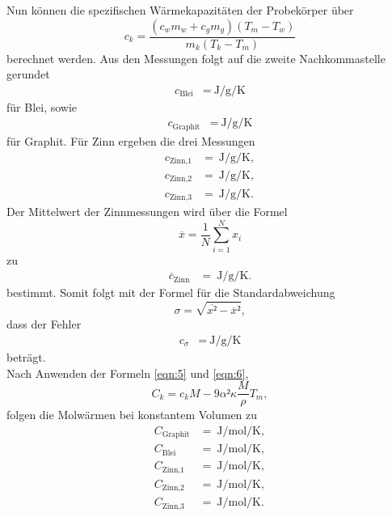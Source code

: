 Nun können die spezifischen Wärmekapazitäten der Probekörper über
\begin{equation}
  c_k = \frac{(c_wm_w+c_gm_g)(T_m-T_w)}{m_k(T_k-T_m)}
\end{equation}
berechnet werden.
Aus den Messungen folgt auf die zweite Nachkommastelle gerundet
\begin{align}
  c_{\text{Blei}} &= \: \si{\joule\per\gram\per\kelvin} \label{Bleiwert:c}
\end{align}
für Blei, sowie
\begin{align}
  c_{\text{Graphit}} &= \: \si{\joule\per\gram\per\kelvin} \label{Bullseye:c}
\end{align}
für Graphit.
Für Zinn ergeben die drei Messungen
\begin{align}
  c_{\text{Zinn,1}} &= \: \si{\joule\per\gram\per\kelvin} \label{Kackwert:c},\\
  c_{\text{Zinn,2}} &= \: \si{\joule\per\gram\per\kelvin},\\
  c_{\text{Zinn,3}} &= \: \si{\joule\per\gram\per\kelvin}.
\end{align}
Der Mittelwert der Zinnmessungen wird über die Formel
\begin{equation}
  \overline{x} = \frac{1}{N} \sum_{i=1}^N x_i \label{eqn:9}
\end{equation}
zu
\begin{align}
  \overline{c}_{\text{Zinn}} &= \: \si{\joule\per\gram\per\kelvin}.
\end{align}
bestimmt.
Somit folgt mit der Formel für die Standardabweichung
\begin{equation}
  \sigma = \sqrt{\overline{x²}-\overline{x}²} \label{eqn:10},
\end{equation}
dass der Fehler
\begin{align}
  c_{\sigma} &= \: \si{\joule\per\gram\per\kelvin}
\end{align}
beträgt.\\
Nach Anwenden der Formeln \ref{eqn:5} und \ref{eqn:6},
\begin{equation}
  C_k = c_k M - 9\alpha² \kappa \frac{M}{\rho} T_m,
\end{equation}
folgen die Molwärmen bei konstantem Volumen zu
\begin{align}
  C_{\text{Graphit}} &= \: \si{\joule\per\mol\per\kelvin} \label{Bullseye:C},\\
  C_{\text{Blei}}    &= \: \si{\joule\per\mol\per\kelvin} \label{Bleiwert:C},\\
  C_{\text{Zinn,1}}  &= \: \si{\joule\per\mol\per\kelvin} \label{Kackwert:C},\\
  C_{\text{Zinn,2}}  &= \: \si{\joule\per\mol\per\kelvin},\\
  C_{\text{Zinn,3}}  &= \: \si{\joule\per\mol\per\kelvin}.
\end{align}

